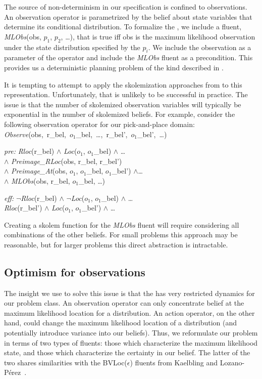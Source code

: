 The source of non-determinism in our specification is confined to
observations. An observation operator is parametrized by the belief
about state variables that determine its conditional distribution. To
formalize the \mld{}, we include a fluent, \emph{MLObs}(obs, $p_1$,
$p_2$, \ldots), that is true iff obs is the maximum likelihood
observation under the state distribution specified by the $p_i$. We
include the observation as a parameter of the operator and include the
\emph{MLObs} fluent as a precondition. This provides us a deterministic
planning problem of the kind described in .


It is tempting to attempt to apply the skolemization approaches from
\cite{srivastava2014combined} to this representation. Unfortunately,
that is unlikely to be successful in practice. The issue is that the
number of skolemized observation variables will typically be
exponential in the number of skolemized beliefs. For example, consider
the following observation operator for our pick-and-place domain:\\
\noindent\emph{Observe}(obs,~r\_bel,~$o_1$\_bel,~\ldots,~r\_bel',~$o_1$\_bel',~\ldots)
\begin{tightlist}
\item[\emph{pre:}] \emph{Rloc}(r\_bel) $\wedge$ \emph{Loc}($o_1$, $o_1$\_bel) $\wedge$ \ldots\\
$\wedge$ \emph{Preimage\_RLoc}(obs, r\_bel, r\_bel')\\
$\wedge$ \emph{Preimage\_At}(obs, $o_1$, $o_1$\_bel, $o_1$\_bel') $\wedge$\ldots\\
$\wedge$ \emph{MLObs}(obs, r\_bel, $o_1$\_bel, \ldots)
\item[\emph{eff:}] $\lnot$\emph{Rloc}(r\_bel) $\wedge$ $\lnot$\emph{Loc}($o_1$, $o_1$\_bel) $\wedge$ \ldots\\
\emph{Rloc}(r\_bel') $\wedge$ \emph{Loc}($o_1$, $o_1$\_bel') $\wedge$ \ldots
\end{tightlist}
Creating a skolem function for the \emph{MLObs} fluent will
require considering all combinations of the other beliefs. For small
problems this approach may be reasonable, but for larger problems this
direct abstraction is intractable.

\subsection{Optimism for observations}
\label{sec-optimism}
The insight we use to solve this issue is that the \mld{} has very
restricted dynamics for our problem class. An observation operator can
only concentrate belief at the maximum likelihood location for a
distribution. An action operator, on the other hand, could change the
maximum likelihood location of a distribution (and potentially
introduce variance into our beliefs). Thus, we reformulate our problem in terms of two types of fluents:
those which characterize the maximum likelihood state, and those
which characterize the certainty in our belief. The latter of the two
shares similarities with the BVLoc($\epsilon$) fluents from Kaelbling
and Lozano-P\'erez~\cite{kaelbling2013integrated}.

